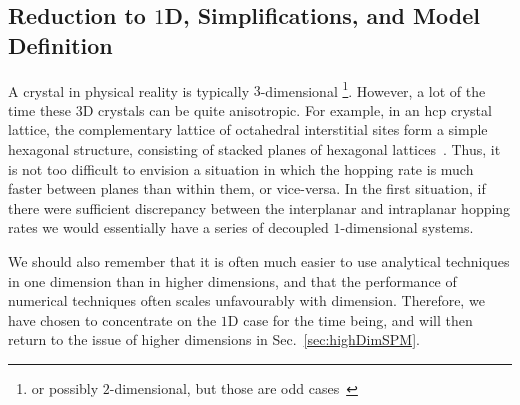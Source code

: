 \subsection{Reduction to $1$D, Simplifications, and Model Definition}
\label{sec:modelDefn}
A crystal in physical reality is typically $3$-dimensional 
\footnote{or possibly $2$-dimensional, but those
are odd cases~\cite{allen2009}}.
However, a lot of the time these $3$D crystals can be quite anisotropic. For example, in
an hcp crystal lattice, the complementary lattice of octahedral interstitial sites form a simple hexagonal
structure, consisting of stacked planes of hexagonal lattices~\cite{Li2018}. Thus, it is not too difficult to envision
a situation in which the hopping rate is much faster between planes than within them, or vice-versa. In the
first situation, if there were sufficient discrepancy between the interplanar and intraplanar hopping rates
we would essentially have a series of decoupled $1$-dimensional systems.

We should also remember that it is often much easier to use analytical techniques in one dimension than
in higher dimensions, and that the performance of numerical techniques often scales unfavourably 
with dimension. Therefore, we have chosen to concentrate on the $1$D case for the time being, and will then
return to the issue of higher dimensions in Sec.~\ref{sec:highDimSPM}.

